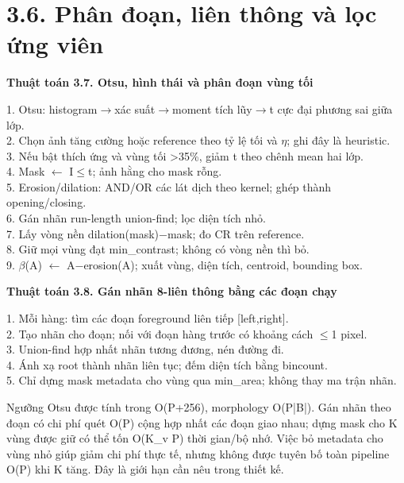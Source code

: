 \documentclass[12pt,a4paper]{extreport}
\begin{document}
\section*{3.6. Phân đoạn,\allowbreak{} liên thông và lọc ứng viên}
\textbf{Thuật toán 3.7. Otsu,\allowbreak{} hình thái và phân đoạn vùng tối}\par{\fontsize{10.5}{12}\selectfont\begin{flushleft}
1. Otsu: histogram\ensuremath{\rightarrow}xác suất\ensuremath{\rightarrow}moment tích lũy\ensuremath{\rightarrow}t cực đại phương sai giữa lớp.\\
2. Chọn ảnh tăng cường hoặc reference theo tỷ lệ tối và \ensuremath{\eta}; ghi đây là heuristic.\\
3. Nếu bật thích ứng và vùng tối >35\%,\allowbreak{} giảm t theo chênh mean hai lớp.\\
4. Mask \ensuremath{\leftarrow} I\ensuremath{\leq}t; ảnh hằng cho mask rỗng.\\
5. Erosion/\allowbreak{}dilation: AND/\allowbreak{}OR các lát dịch theo kernel; ghép thành opening/\allowbreak{}closing.\\
6. Gán nhãn run-length union-find; lọc diện tích nhỏ.\\
7. Lấy vòng nền dilation(mask)\ensuremath{-}mask; đo CR trên reference.\\
8. Giữ mọi vùng đạt min\_contrast; không có vòng nền thì bỏ.\\
9. \ensuremath{\beta}(A) \ensuremath{\leftarrow} A\ensuremath{-}erosion(A); xuất vùng,\allowbreak{} diện tích,\allowbreak{} centroid,\allowbreak{} bounding box.\\
\end{flushleft}}
\textbf{Thuật toán 3.8. Gán nhãn 8-liên thông bằng các đoạn chạy}\par{\fontsize{10.5}{12}\selectfont\begin{flushleft}
1. Mỗi hàng: tìm các đoạn foreground liên tiếp [left,\allowbreak{}right].\\
2. Tạo nhãn cho đoạn; nối với đoạn hàng trước có khoảng cách \ensuremath{\leq}1 pixel.\\
3. Union-find hợp nhất nhãn tương đương,\allowbreak{} nén đường đi.\\
4. Ánh xạ root thành nhãn liên tục; đếm diện tích bằng bincount.\\
5. Chỉ dựng mask metadata cho vùng qua min\_area; không thay ma trận nhãn.\\
\end{flushleft}}
Ngưỡng Otsu được tính trong O(P+\allowbreak{}256),\allowbreak{} morphology O(P|B|). Gán nhãn theo đoạn có chi phí quét O(P) cộng hợp nhất các đoạn giao nhau; dựng mask cho K vùng được giữ có thể tốn O(K\_v P) thời gian/\allowbreak{}bộ nhớ. Việc bỏ metadata cho vùng nhỏ giúp giảm chi phí thực tế,\allowbreak{} nhưng không được tuyên bố toàn pipeline O(P) khi K tăng. Đây là giới hạn cần nêu trong thiết kế.
\par
\end{document}
